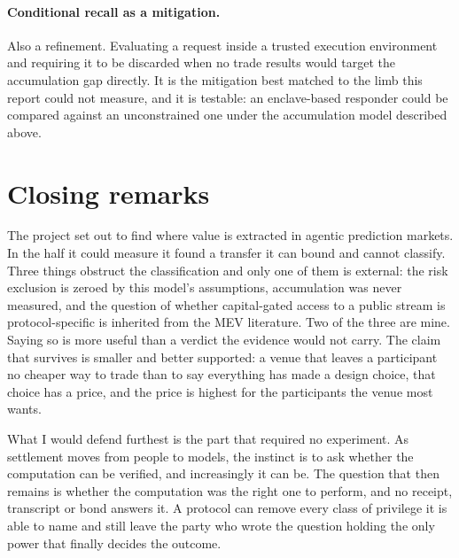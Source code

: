 \paragraph{Conditional recall as a mitigation.} Also a refinement. Evaluating a request inside a trusted
execution environment and requiring it to be discarded when no trade results would target
the accumulation gap directly. It is the mitigation best matched to the limb this report
could not measure, and it is testable: an enclave-based responder could be compared against
an unconstrained one under the accumulation model described above.

\section{Closing remarks}

The project set out to find where value is extracted in agentic prediction markets. In the
half it could measure it found a transfer it can bound and cannot classify. Three things
obstruct the classification and only one of them is external: the risk exclusion is zeroed
by this model's assumptions, accumulation was never measured, and the question of whether
capital-gated access to a public stream is protocol-specific is inherited from the MEV
literature. Two of the three are mine. Saying so
is more useful than a verdict the evidence would not carry. The claim that survives is
smaller and better supported: a venue that leaves a participant no cheaper way to trade than
to say everything has made a design choice, that choice has a price, and the price is
highest for the participants the venue most wants.

What I would defend furthest is the part that required no experiment. As settlement moves
from people to models, the instinct is to ask whether the computation can be verified, and
increasingly it can be. The question that then remains is whether the computation was the
right one to perform, and no receipt, transcript or bond answers it. A protocol can remove
every class of privilege it is able to name and still leave the party who wrote the question
holding the only power that finally decides the outcome.

